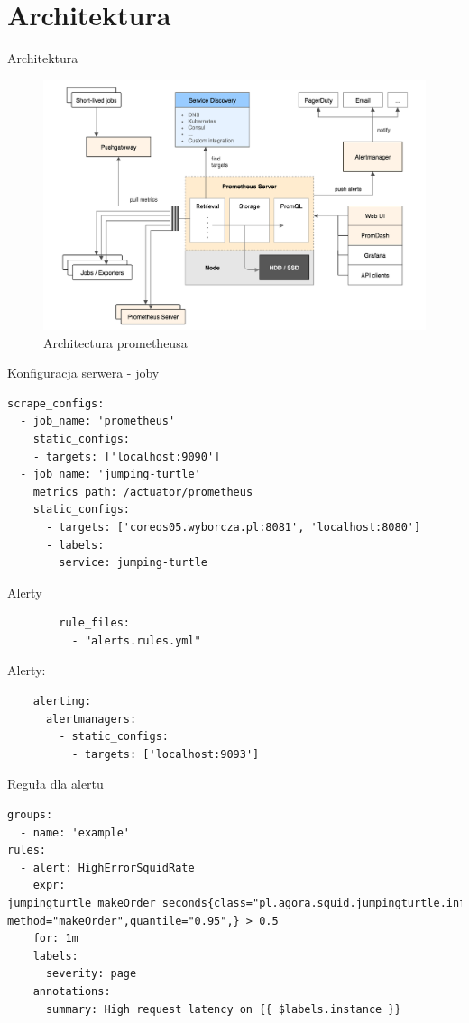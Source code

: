 \documentclass[epic,eepic,aspectratio=169,12pt]{beamer}
\begin{document}
\section{Architektura}
\begin{frame}{Architektura}
		\begin{figure}
			\centering
			\includegraphics[width=0.55\linewidth]{architecture}
			\caption{Architectura prometheusa}
			\label{fig:architecture}
		\end{figure}
\end{frame}
\begin{frame}[fragile]{Konfiguracja serwera - joby}
	\begin{verbatim}
scrape_configs:		
  - job_name: 'prometheus'
    static_configs:
    - targets: ['localhost:9090']		
  - job_name: 'jumping-turtle'
    metrics_path: /actuator/prometheus
    static_configs:
      - targets: ['coreos05.wyborcza.pl:8081', 'localhost:8080']
	  - labels:
        service: jumping-turtle
	\end{verbatim}
\end{frame}
\begin{frame}[fragile]{Alerty}
	\begin{verbatim}
		rule_files:
		  - "alerts.rules.yml"		  
	\end{verbatim}
	Alerty:
	\begin{verbatim}
	alerting:
	  alertmanagers:
	    - static_configs:
	      - targets: ['localhost:9093']
	\end{verbatim}
\end{frame}
\begin{frame}[fragile]{Reguła dla alertu}
\begin{verbatim}
groups:
  - name: 'example'
rules:
  - alert: HighErrorSquidRate
    expr: jumpingturtle_makeOrder_seconds{class="pl.agora.squid.jumpingturtle.infrastructure.port.DomainOrderProvider", method="makeOrder",quantile="0.95",} > 0.5
    for: 1m
    labels:
      severity: page
    annotations:
      summary: High request latency on {{ $labels.instance }}

\end{verbatim}
\end{frame}
\end{document}
